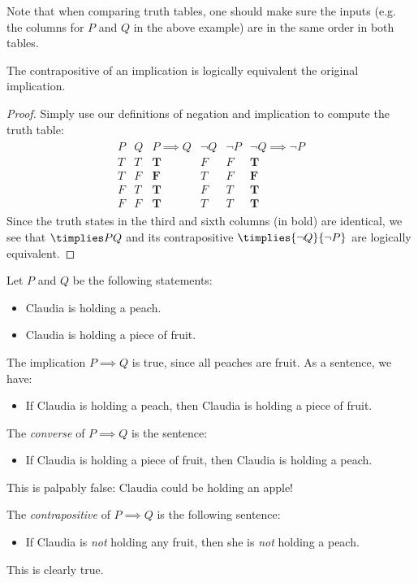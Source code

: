 \noindent Note that when comparing truth tables, one should make sure the inputs (e.g. the columns for $P$ and $Q$ in the above example) are in the same order in both tables.

\begin{thm}\label{thm:contrapos}
The contrapositive of an implication is logically equivalent the original implication.
\end{thm}

\begin{proof}
Simply use our definitions of negation and implication to compute the truth table:
\begin{gather*}
\begin{array}{cc|c||cc|c}
P & Q & P\implies Q & \neg Q & \neg P & \neg Q\implies\neg P\\\hline
T & T & \mathbf T & F & F & \mathbf T\\
T & F & \mathbf F & T & F & \mathbf F\\
F & T & \mathbf T & F & T & \mathbf T\\
F & F & \mathbf T & T & T & \mathbf T
\end{array}
\end{gather*}
Since the truth states in the third and sixth columns (in bold) are identical, we see that $\timplies PQ$ and its contrapositive $\timplies{\neg Q}{\neg P}$ are logically equivalent.
\end{proof}

\begin{example}
Let $P$ and $Q$ be the following statements:
\begin{itemize}\setlength{\itemsep}{0pt}
  \item[] Claudia is holding a peach.
  \item[] Claudia is holding a piece of fruit.
\end{itemize}
The implication $P\implies Q$ is true, since all peaches are fruit. As a sentence, we have:
\begin{itemize}\setlength{\itemsep}{0pt}
  \item[]If Claudia is holding a peach, then Claudia is holding a piece of fruit.
\end{itemize}
The \emph{converse} of $P\implies Q$ is the sentence:
\begin{itemize}\setlength{\itemsep}{0pt}
  \item[]If Claudia is holding a piece of fruit, then Claudia is holding a peach.
\end{itemize}
This is palpably false: Claudia could be holding an apple!\\\pagebreak[2]

\noindent The \emph{contrapositive} of $P\implies Q$ is the following sentence:
\begin{itemize}\setlength{\itemsep}{0pt}
  \item[]If Claudia is \emph{not} holding any fruit, then she is \emph{not} holding a peach.
\end{itemize}
This is clearly true.
\end{example}



